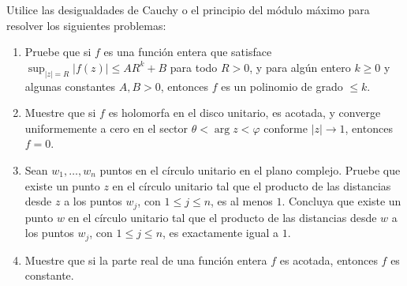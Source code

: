 \setcounter{eje}{14}
\begin{ejer}
Utilice las desigualdades de Cauchy o el principio del módulo máximo para resolver los siguientes problemas:
\begin{enumerate}[label=(\alph*),leftmargin=1.5em]
    \item Pruebe que si $f$ es una función entera que satisface $\sup_{|z|=R} |f(z)| \leq A R^k + B$ para todo $R>0$, y para algún entero $k \geq 0$ y algunas constantes $A, B > 0$, entonces $f$ es un polinomio de grado $\leq k$.
    \item Muestre que si $f$ es holomorfa en el disco unitario, es acotada, y converge uniformemente a cero en el sector $\theta < \arg z < \varphi$ conforme $|z| \to 1$, entonces $f = 0$.
    \item Sean $w_1, \ldots, w_n$ puntos en el círculo unitario en el plano complejo. Pruebe que existe un punto $z$ en el círculo unitario tal que el producto de las distancias desde $z$ a los puntos $w_j$, con $1 \leq j \leq n$, es al menos $1$. Concluya que existe un punto $w$ en el círculo unitario tal que el producto de las distancias desde $w$ a los puntos $w_j$, con $1 \leq j \leq n$, es exactamente igual a $1$.
    \item Muestre que si la parte real de una función entera $f$ es acotada, entonces $f$ es constante.
\end{enumerate}
\end{ejer}
